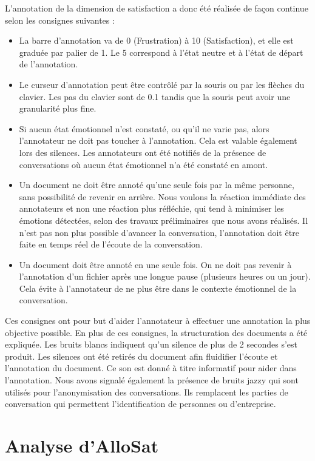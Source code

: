L'annotation de la dimension de satisfaction a donc été réalisée de façon continue selon les consignes suivantes :
\begin{itemize}
  \item La barre d'annotation va de 0 (Frustration) à 10 (Satisfaction), et elle est graduée par palier de 1. Le 5 correspond à l'état neutre et à l'état de départ de l'annotation.
  \item Le curseur d'annotation peut être contrôlé par la souris ou par les flèches du clavier. Les pas du clavier sont de 0.1 tandis que la souris peut avoir une granularité plus fine.
  \item Si aucun état émotionnel n'est constaté, ou qu'il ne varie pas, alors l'annotateur ne doit pas toucher à l'annotation. Cela est valable également lors des silences. Les annotateurs ont été notifiés de la présence de conversations où aucun état émotionnel n'a été constaté en amont.
  \item Un document ne doit être annoté qu'une seule fois par la même personne, sans possibilité de revenir en arrière. Nous voulons la réaction immédiate des annotateurs et non une réaction plus réfléchie, qui tend à minimiser les émotions détectées, selon des travaux préliminaires que nous avons réalisés. Il n'est pas non plus possible d'avancer la conversation, l'annotation doit être faite en temps réel de l'écoute de la conversation.
  \item Un document doit être annoté en une seule fois. On ne doit pas revenir à l'annotation d'un fichier après une longue pause (plusieurs heures ou un jour). Cela évite à l'annotateur de ne plus être dans le contexte émotionnel de la conversation.
\end{itemize}

Ces consignes ont pour but d'aider l'annotateur à effectuer une annotation la plus objective possible. En plus de ces consignes, la structuration des documents a été expliquée. Les bruits blancs indiquent qu'un silence de plus de 2 secondes s'est produit. Les silences ont été retirés du document afin fluidifier l'écoute et l'annotation du document. Ce son est donné à titre informatif pour aider dans l'annotation. Nous avons signalé également la présence de bruits jazzy qui sont utilisés pour l'anonymisation des conversations. Ils remplacent les parties de conversation qui permettent l'identification de personnes ou d'entreprise.

\section{Analyse d'AlloSat}

